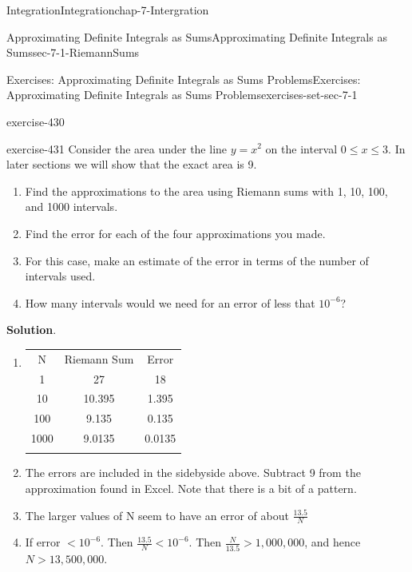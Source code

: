 \documentclass[oneside,10pt,]{book}
\numberwithin{equation}{section}
\newcommand{\hrulethin}  {\noalign{\hrule height 0.04em}}
\newcommand{\hrulethick} {\noalign{\hrule height 0.11em}}
\newcommand{\lt}{<}
\newcommand{\gt}{>}
\begin{document}
\begin{chapterptx}{Integration}{}{Integration}{}{}{chap-7-Intergration}
\begin{sectionptx}{Approximating Definite Integrals as Sums}{}{Approximating Definite Integrals as Sums}{}{}{sec-7-1-RiemannSums}
\begin{exercises-subsection-numberless}{Exercises: Approximating Definite Integrals as Sums Problems}{}{Exercises: Approximating Definite Integrals as Sums Problems}{}{}{exercises-set-sec-7-1}
\begin{divisionexercise}{8}{}{}{exercise-430}
\end{divisionexercise}%
\begin{divisionexercise}{9}{}{}{exercise-431}%
\hypertarget{p-2590}{}%
Consider the area under the line \(y = x^2\) on the interval \(0 \le  x \le  3\).  In later sections we will show that the exact area is 9.%
\leavevmode%
\begin{enumerate}[label=(\alph*)]
\item\hypertarget{li-691}{}\hypertarget{p-2591}{}%
Find the approximations to the area using Riemann sums with 1, 10, 100, and 1000 intervals.%
\item\hypertarget{li-692}{}\hypertarget{p-2592}{}%
Find the error for each of the four approximations you made.%
\item\hypertarget{li-693}{}\hypertarget{p-2593}{}%
For this case, make an estimate of the error in terms of the number of intervals used.%
\item\hypertarget{li-694}{}\hypertarget{p-2594}{}%
How many intervals would we need for an error of less that \(10^{-6}\)?%
\end{enumerate}
\par\smallskip%
\noindent\textbf{Solution}.\hypertarget{solution-218}{}\quad%
\leavevmode%
\begin{enumerate}[label=(\alph*)]
\item\hypertarget{li-695}{}\leavevmode%
\begin{sidebyside}{1}{0}{0}{0}%
\begin{sbspanel}{1}%
{\centering%
\begin{tabular}{ccc}\hrulethick
N&Riemann Sum&Error\tabularnewline\hrulethin
1&27&18\tabularnewline\hrulethin
10&10.395&1.395\tabularnewline\hrulethin
100&9.135&0.135\tabularnewline\hrulethin
1000&9.0135&0.0135\tabularnewline\hrulethin
\end{tabular}
\par}
\end{sbspanel}%
\end{sidebyside}%
%
\item\hypertarget{li-696}{}\hypertarget{p-2595}{}%
The errors are included in the sidebyside above. Subtract 9 from the approximation found in Excel.  Note that there is a bit of a pattern.%
\item\hypertarget{li-697}{}\hypertarget{p-2596}{}%
The larger values of N seem to have an error of about \(\frac{13.5}{N}\)%
\item\hypertarget{li-698}{}\hypertarget{p-2597}{}%
If  error \(\lt 10^{-6}\). Then \(\frac{13.5}{N}\lt 10^{-6}\). Then \(\frac{N}{13.5}\gt 1,000,000\), and hence \(N\gt 13,500,000\).%

\end{enumerate}
\end{divisionexercise}
\end{exercises-subsection-numberless}
\end{sectionptx}
\end{chapterptx}
\end{document}
